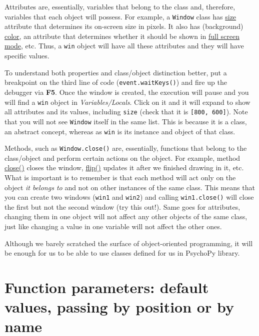 \documentclass[
]{book}
\begin{document}
Attributes are, essentially, variables that belong to the class and, therefore, variables that each object will possess. For example, a \texttt{Window} class has \href{https://psychopy.org/api/visual/window.html\#psychopy.visual.Window.size}{size} attribute that determines its on-screen size in pixels. It also has (background) \href{https://psychopy.org/api/visual/window.html\#psychopy.visual.Window.color}{color}, an attribute that determines whether it should be shown in \href{https://psychopy.org/api/visual/window.html\#psychopy.visual.Window.fullscr}{full screen mode}, etc. Thus, a \texttt{win} object will have all these attributes and they will have specific values.

To understand both properties and class/object distinction better, put a breakpoint on the third line of code (\texttt{event.waitKeys()}) and fire up the debugger via \textbf{F5}. Once the window is created, the execution will pause and you will find a \texttt{win} object in \emph{Variables/Locals}. Click on it and it will expand to show all attributes and its values, including \texttt{size} (check that it is \texttt{{[}800,\ 600{]}}). Note that you will not see \texttt{Window} itself in the same list. This is because it is a class, an abstract concept, whereas as \texttt{win} is its instance and object of that class.

Methods, such as \texttt{Window.close()} are, essentially, functions that belong to the class/object and perform certain actions on the object. For example, method \href{https://psychopy.org/api/visual/window.html\#psychopy.visual.Window.close}{close()} closes the window, \href{https://psychopy.org/api/visual/window.html\#psychopy.visual.Window.flip}{flip()} updates it after we finished drawing in it, etc. What is important is to remember is that each method will act only on the object \emph{it belongs to} and not on other instances of the same class. This means that you can create two windows (\texttt{win1} and \texttt{win2}) and calling \texttt{win1.close()} will close the first but not the second window (try this out!). Same goes for attributes, changing them in one object will not affect any other objects of the same class, just like changing a value in one variable will not affect the other ones.

Although we barely scratched the surface of object-oriented programming, it will be enough for us to be able to use classes defined for us in PsychoPy library.

\hypertarget{arguments-by-position-or-name}{%
\section{Function parameters: default values, passing by position or by name}\label{arguments-by-position-or-name}}
\end{document}
